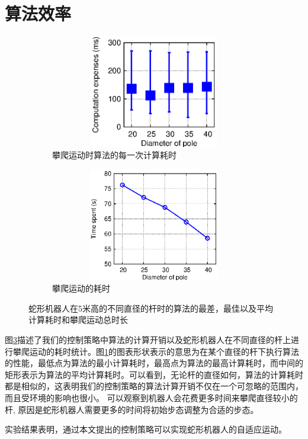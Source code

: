 \section{算法效率}
\begin{figure}[htbp]
	\centering
	\begin{subfigure}{0.45\textwidth}{
			\centering
			\includegraphics[width=1\textwidth,height=140pt]{figure/chap05/figCE.eps}
			\caption{攀爬运动时算法的每一次计算耗时}
			\label{fig:ce}
		}
	\end{subfigure}
	\begin{subfigure}{0.45\textwidth}{
			\centering
			\includegraphics[width=1\textwidth,height=140pt]{figure/chap05/TimeSpent.eps}
			\caption{攀爬运动的耗时}
			\label{fig:TS}
		}
	\end{subfigure}
	\caption{蛇形机器人在5米高的不同直径的杆时的算法的最差，最佳以及平均计算耗时和攀爬运动总时长}
	\label{fig:CE-TS}
\end{figure}
图\ref{fig:CE-TS}描述了我们的控制策略中算法的计算开销以及蛇形机器人在不同直径的杆上进行攀爬运动的耗时统计。图\ref{fig:ce}的图表形状表示的意思为在某个直径的杆下执行算法的性能，最低点为算法的最小计算耗时，最高点为算法的最高计算耗时，而中间的矩形表示为算法的平均计算耗时。可以看到，无论杆的直径如何，算法的计算耗时都是相似的，这表明我们的控制策略的算法计算开销不仅在一个可忽略的范围内，而且受环境的影响也很小。 可以观察到机器人会花费更多时间来攀爬直径较小的杆, 原因是蛇形机器人需要更多的时间将初始步态调整为合适的步态。

实验结果表明，通过本文提出的控制策略可以实现蛇形机器人的自适应运动。



